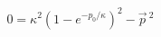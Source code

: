 \begin{equation}\label{19}
0 =\kappa^2\left(1 - e^{-p_0/\kappa} \right)^2 - \vec{p}\,{}^2
\end{equation}

